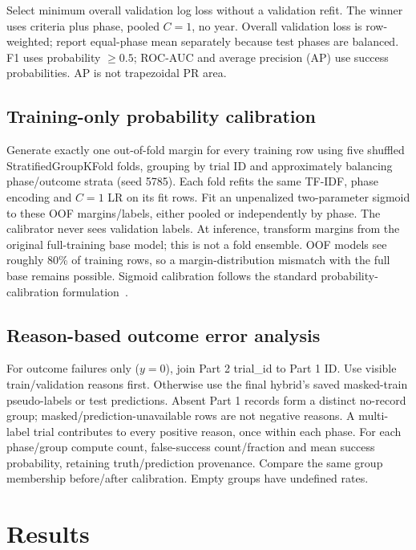 \documentclass[10pt,twocolumn,letterpaper]{article}
\begin{document}
Select minimum overall validation log loss without a validation refit. The winner
uses criteria plus phase, pooled $C=1$, no year. Overall validation loss is
row-weighted; report equal-phase mean separately because test phases are balanced.
F1 uses probability $\geq0.5$; ROC-AUC and average precision (AP) use success
probabilities. AP is not trapezoidal PR area.

\subsection{Training-only probability calibration}
Generate exactly one out-of-fold margin for every training row using five
shuffled StratifiedGroupKFold folds, grouping by trial ID and approximately
balancing phase/outcome strata (seed 5785). Each fold refits the same TF-IDF,
phase encoding and $C=1$ LR on its fit rows. Fit an unpenalized two-parameter
sigmoid to these OOF margins/labels, either pooled or independently by phase.
The calibrator never sees validation labels. At inference, transform margins
from the original full-training base model; this is not a fold ensemble.
OOF models see roughly 80\% of training rows, so a margin-distribution mismatch
with the full base remains possible. Sigmoid calibration follows the standard
probability-calibration formulation~\cite{calibration}.

\subsection{Reason-based outcome error analysis}
For outcome failures only ($y=0$), join Part 2 trial\_id to Part 1 ID. Use visible
train/validation reasons first. Otherwise use the final hybrid's saved masked-train
pseudo-labels or test predictions. Absent Part 1 records form a distinct
no-record group; masked/prediction-unavailable rows are not negative reasons.
A multi-label trial contributes to every positive reason, once within each phase.
For each phase/group compute count, false-success count/fraction and mean success
probability, retaining truth/prediction provenance. Compare the same group
membership before/after calibration. Empty groups have undefined rates.

\section{Results}
\end{document}
